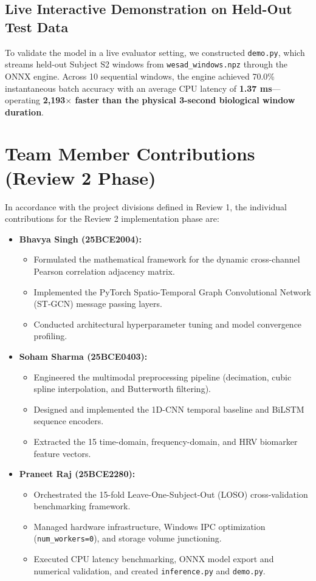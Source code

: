 \documentclass[conference]{IEEEtran}
\begin{document}
\subsection{Live Interactive Demonstration on Held-Out Test Data}
To validate the model in a live evaluator setting, we constructed \texttt{demo.py}, which streams held-out Subject S2 windows from \texttt{wesad\_windows.npz} through the ONNX engine. Across 10 sequential windows, the engine achieved 70.0\% instantaneous batch accuracy with an average CPU latency of \textbf{1.37 ms}---operating \textbf{2,193$\times$ faster than the physical 3-second biological window duration}.

\section{Team Member Contributions (Review 2 Phase)}
In accordance with the project divisions defined in Review 1, the individual contributions for the Review 2 implementation phase are:

\begin{itemize}
    \item \textbf{Bhavya Singh (25BCE2004):}
    \begin{itemize}
        \item Formulated the mathematical framework for the dynamic cross-channel Pearson correlation adjacency matrix.
        \item Implemented the PyTorch Spatio-Temporal Graph Convolutional Network (ST-GCN) message passing layers.
        \item Conducted architectural hyperparameter tuning and model convergence profiling.
    \end{itemize}
    
    \item \textbf{Soham Sharma (25BCE0403):}
    \begin{itemize}
        \item Engineered the multimodal preprocessing pipeline (decimation, cubic spline interpolation, and Butterworth filtering).
        \item Designed and implemented the 1D-CNN temporal baseline and BiLSTM sequence encoders.
        \item Extracted the 15 time-domain, frequency-domain, and HRV biomarker feature vectors.
    \end{itemize}

    \item \textbf{Praneet Raj (25BCE2280):}
    \begin{itemize}
        \item Orchestrated the 15-fold Leave-One-Subject-Out (LOSO) cross-validation benchmarking framework.
        \item Managed hardware infrastructure, Windows IPC optimization (\texttt{num\_workers=0}), and storage volume junctioning.
        \item Executed CPU latency benchmarking, ONNX model export and numerical validation, and created \texttt{inference.py} and \texttt{demo.py}.
    \end{itemize}
\end{itemize}
\end{document}
